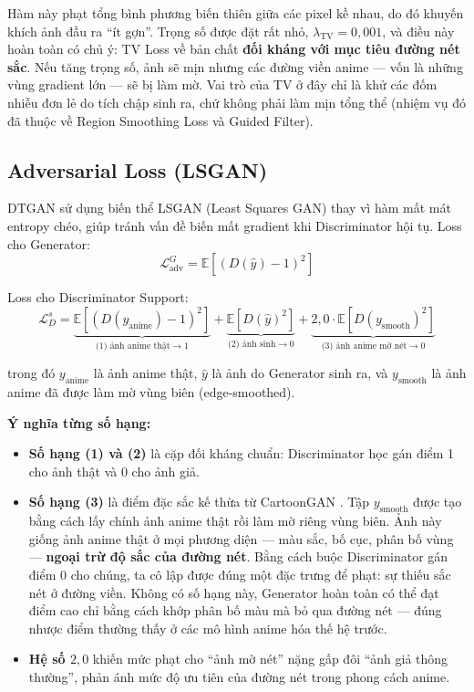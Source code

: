 Hàm này phạt tổng bình phương biến thiên giữa các pixel kề nhau, do đó khuyến khích ảnh đầu ra ``ít gợn''. Trọng số được đặt rất nhỏ, $\lambda_{\text{TV}} = 0{,}001$, và điều này hoàn toàn có chủ ý: TV Loss về bản chất \textbf{đối kháng với mục tiêu đường nét sắc}. Nếu tăng trọng số, ảnh sẽ mịn nhưng các đường viền anime --- vốn là những vùng gradient lớn --- sẽ bị làm mờ. Vai trò của TV ở đây chỉ là khử các đốm nhiễu đơn lẻ do tích chập sinh ra, chứ không phải làm mịn tổng thể (nhiệm vụ đó đã thuộc về Region Smoothing Loss và Guided Filter).

\subsection{Adversarial Loss (LSGAN)}
\label{subsec:adv_loss}

DTGAN sử dụng biến thể LSGAN (Least Squares GAN) \cite{Mao2017} thay vì hàm mất mát entropy chéo, giúp tránh vấn đề biến mất gradient khi Discriminator hội tụ. Loss cho Generator:
\begin{equation}
\label{eq:gen_adv_loss}
\mathcal{L}_{\text{adv}}^G = \mathbb{E}\!\left[\left(D(\widehat{y}) - 1\right)^2\right]
\end{equation}

Loss cho Discriminator Support:
\begin{equation}
\label{eq:disc_support_loss}
\mathcal{L}_D^s = \underbrace{\mathbb{E}\!\left[\left(D(y_{\text{anime}}) - 1\right)^2\right]}_{\text{(1) ảnh anime thật} \to 1} + \underbrace{\mathbb{E}\!\left[D(\widehat{y})^2\right]}_{\text{(2) ảnh sinh} \to 0} + \underbrace{2{,}0 \cdot \mathbb{E}\!\left[D(y_{\text{smooth}})^2\right]}_{\text{(3) ảnh anime mờ nét} \to 0}
\end{equation}

\noindent trong đó $y_{\text{anime}}$ là ảnh anime thật, $\widehat{y}$ là ảnh do Generator sinh ra, và $y_{\text{smooth}}$ là ảnh anime đã được làm mờ vùng biên (edge-smoothed).

\textbf{Ý nghĩa từng số hạng:}
\begin{itemize}
    \item \textbf{Số hạng (1) và (2)} là cặp đối kháng chuẩn: Discriminator học gán điểm 1 cho ảnh thật và 0 cho ảnh giả.
    \item \textbf{Số hạng (3)} là điểm đặc sắc kế thừa từ CartoonGAN \cite{Chen2018CartoonGAN}. Tập $y_{\text{smooth}}$ được tạo bằng cách lấy chính ảnh anime thật rồi làm mờ riêng vùng biên. Ảnh này giống ảnh anime thật ở mọi phương diện --- màu sắc, bố cục, phân bố vùng --- \textbf{ngoại trừ độ sắc của đường nét}. Bằng cách buộc Discriminator gán điểm 0 cho chúng, ta cô lập được đúng một đặc trưng để phạt: sự thiếu sắc nét ở đường viền. Không có số hạng này, Generator hoàn toàn có thể đạt điểm cao chỉ bằng cách khớp phân bố màu mà bỏ qua đường nét --- đúng nhược điểm thường thấy ở các mô hình anime hóa thế hệ trước.
    \item \textbf{Hệ số $2{,}0$} khiến mức phạt cho ``ảnh mờ nét'' nặng gấp đôi ``ảnh giả thông thường'', phản ánh mức độ ưu tiên của đường nét trong phong cách anime.
\end{itemize}


